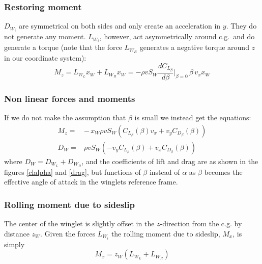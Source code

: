 \subsubsection{Restoring moment}

$D_{W_i}$ are symmetrical on both sides and only create an acceleration in $y$.
They do not generate any moment.
$L_{W_i}$, however, act asymmetrically around c.g.~and do generate a torque (note that the force $L_{W_R}$ generates a negative torque around $z$ in our coordinate system):
\begin{equation}
    M_z = L_{W_L} x_W + L_{W_R} x_W = - \rho v S_W \frac{d C_{L_\beta}}{d \beta} \big\vert_{\beta=0} \, \beta \, v_x x_W
\end{equation}

\subsubsection{Non linear forces and moments}
If we do not make the assumption that $\beta$ is small we instead get the equations:
\begin{equation}\begin{split}
    M_z =& - \, x_W \rho v S_W  \left( C_{L_\beta}(\beta) v_x + v_y C_{D_\beta}(\beta) \right) \\
    D_{W} =& \rho v S_W \left(-v_y C_{L_\beta}(\beta) + v_x C_{D_\beta}(\beta) \right)
\end{split}\end{equation}
where $D_W = D_{W_L} + D_{W_R}$, and the coefficients of lift and drag are as shown in the figures \ref{clalpha} and \ref{drag}, but functions of $\beta$ instead of $\alpha$ as $\beta$ becomes the effective angle of attack in the winglets reference frame.



\subsubsection{Rolling moment due to sideslip}

The center of the winglet is slightly offset in the $z$-direction from the c.g. by distance $z_W$. 
Given the forces $L_{W_i}$ the rolling moment due to sideslip, $M_x$, is simply
\begin{equation}
    M_x = z_W (L_{W_L} + L_{W_R})
\end{equation}

